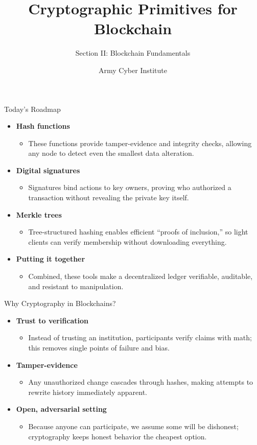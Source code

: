 \documentclass[aspectratio=169]{beamer}
\title[Blockchain II — Day 3]{Cryptographic Primitives for Blockchain}
\subtitle{Section II: Blockchain Fundamentals}
\author{Army Cyber Institute}
\institute{Army Cyber Institute, U.S. Military Academy}
\date{}
\begin{document}
\begin{frame}
  \titlepage
\end{frame}

\begin{frame}{Today's Roadmap}
  \begin{itemize}
    \item \textbf{Hash functions}
      \begin{itemize}
        \item These functions provide tamper-evidence and integrity checks, allowing any node to detect even the smallest data alteration.
      \end{itemize}
    \item \textbf{Digital signatures}
      \begin{itemize}
        \item Signatures bind actions to key owners, proving who authorized a transaction without revealing the private key itself.
      \end{itemize}
    \item \textbf{Merkle trees}
      \begin{itemize}
        \item Tree-structured hashing enables efficient “proofs of inclusion,” so light clients can verify membership without downloading everything.
      \end{itemize}
    \item \textbf{Putting it together}
      \begin{itemize}
        \item Combined, these tools make a decentralized ledger verifiable, auditable, and resistant to manipulation.
      \end{itemize}
  \end{itemize}
\end{frame}

\begin{frame}{Why Cryptography in Blockchains?}
  \begin{itemize}
    \item \textbf{Trust to verification}
      \begin{itemize}
        \item Instead of trusting an institution, participants verify claims with math; this removes single points of failure and bias.
      \end{itemize}
    \item \textbf{Tamper-evidence}
      \begin{itemize}
        \item Any unauthorized change cascades through hashes, making attempts to rewrite history immediately apparent.
      \end{itemize}
    \item \textbf{Open, adversarial setting}
      \begin{itemize}
        \item Because anyone can participate, we assume some will be dishonest; cryptography keeps honest behavior the cheapest option.
      \end{itemize}
  \end{itemize}
\end{frame}
\end{document}
